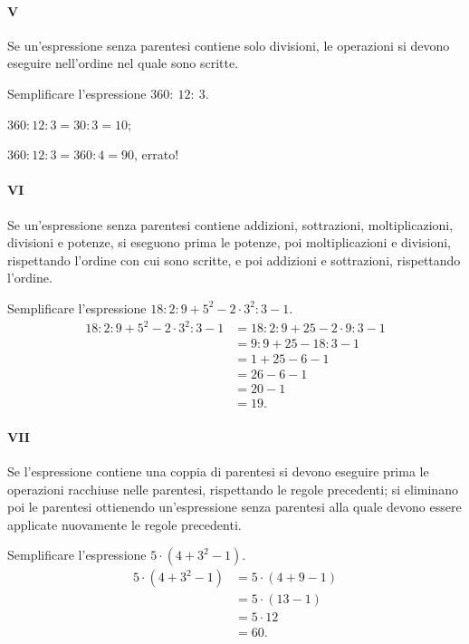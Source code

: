 \paragraph {V} Se un'espressione senza parentesi contiene solo divisioni, le operazioni si devono eseguire
nell'ordine nel quale sono scritte.
\begin{exrig}
 \begin{esempio}
 Semplificare l'espressione $360:~12:~3$.
 \begin{itemize*}
 \item $360:12:3=30:3=10$;
 \item $360:12:3=360:4=90$, errato!
\end{itemize*}
 \end{esempio}
\end{exrig}

\paragraph {VI} Se un'espressione senza parentesi contiene addizioni, sottrazioni, moltiplicazioni, divisioni e
potenze, si eseguono prima le potenze, poi moltiplicazioni e divisioni, rispettando l'ordine con cui sono
scritte, e poi addizioni e sottrazioni, rispettando l'ordine.
\begin{exrig}
 \begin{esempio}
Semplificare l'espressione $18:2:9+5^2-2\cdot3^2:3-1$.
 \begin{align*}
 18:2:9+5^2-2\cdot3^2:3-1&=18:2:9+25-2\cdot 9:3-1\\
			 &=9:9+25-18:3-1\\
			 &=1+25-6-1\\
			 &=26-6-1\\
			 &=20-1\\
 &=19.
 \end{align*}
 \end{esempio}
\end{exrig}

\paragraph {VII} Se l'espressione contiene una coppia di parentesi si devono eseguire prima le operazioni
racchiuse nelle parentesi, rispettando le regole precedenti; si eliminano poi le parentesi ottienendo
un'espressione senza parentesi alla quale devono essere applicate nuovamente le regole precedenti.
\begin{exrig}
 \begin{esempio}
Semplificare l'espressione $5\cdot(4+3^2-1)$.
 \begin{align*}
 5\cdot(4+3^2-1)&=5\cdot(4+9-1)\\
		 &=5\cdot(13-1)\\
		 &=5\cdot 12\\
		 &=60.
 \end{align*}
\end{esempio}
\end{exrig}


